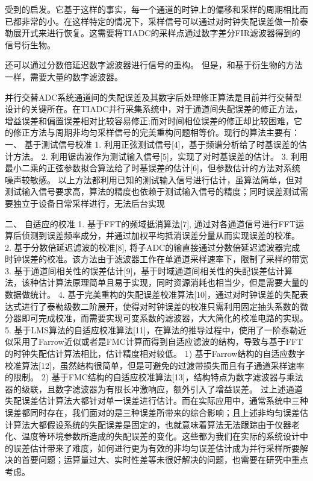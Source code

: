 				受到的启发。它基于这样的事实，每一个通道的时钟上的偏移和采样的周期相比而已都非常的小。在这样特定的情况下，采样信号可以通过对时钟失配误差做一阶泰勒展开式来进行恢复。这需要将TIADC的采样点通过数字差分FIR滤波器得到的信号衍生物。
				\par
				
				还可以通过分数倍延迟数字滤波器进行信号的重构。
				但是，和基于衍生物的方法一样，需要大量的数字滤波器。
				
				
				
				
					
					
				并行交替ADC系统通道间的失配误差及其数字后处理修正算法是目前并行交替型设计的关键所在。在TIADC并行采集系统中，对于通道间失配误差的修正方法，增益误差和偏置误差相对比较容易修正;而对时间相位误差的修正却比较困难，它的修正方法与周期非均匀采样信号的完美重构问题相等价。现行的算法主要有：
一、	基于测试信号校准
1.	利用正弦测试信号[4]，基于频谱分析给了时基误差的估计方法。
2.	利用锯齿波作为测试输入信号[5]，实现了对时基误差的估计。
3.	利用最小二乘的正弦参数拟合算法给了时基误差的估计[6]，但参数估计的方法对系统噪声较敏感。
以上方法都利用已知的测试输入信号进行估计，虽算法简单，但对测试输入信号要求高，算法的精度也依赖于测试输入信号的精度；同时误差测试需要独立于设备日常采样进行，无法后台实现


二、	自适应的校准
1.	基于FFT的频域抵消算法[7], 通过对各通道信号进行FFT运算后侦测到误差频率成分，并通过加权平均抵消误差分量从而实现误差的校准。
2.	基于分数倍延迟滤波的校准[8], 将子ADC的输直接通过分数倍延迟滤波器完成时钟误差的校准。该方法由于滤波器工作在单通道采样速率下，限制了采样的带宽
3.	基于通道间相关性的误差估计[9]，基于时域通道间相关性的失配误差估计算法，该种估计算法原理简单且易于实现，同时资源消耗也相当少，但是需要大量的数据做统计。
4.	基于完美重构的失配误差校准算法[10]，通过对时钟误差的失配表达式进行了泰勒级数二阶展开，使得对时钟误差的校准只需利用固定抽头系数的微分器即可完成校准，而需要实现可变系数的滤波器，大大简化的校准电路的实现。
5.	基于LMS算法的自适应校准算法[11]，在算法的推导过程中，使用了一阶泰勒近似采用了Farrow近似或者是FMC计算而得到自适应滤波的结构，导致与基于FFT的时钟失配估计算法相比，估计精度相对较低。
1)	基于Farrow结构的自适应数字校准算法[12]，虽然结构很简单，但是可避免的过渡带损失而且有子通道采样速率的限制。
2)	基于FMC结构的自适应校准算法[13]，结构特点为数字滤波器与乘法器的级联，且数字滤波器为有限长冲激响应，额外引入了增益误差。
过上述通道失配误差估计算法大都针对单一误差进行估计。而在实际应用中，通常系统中三种误差都同时存在，我们面对的是三种误差所带来的综合影响；且上述非均匀误差估计算法大都假设系统的失配误差是固定的，也就意味着算法无法跟踪由于仪器老化、温度等环境参数所造成的失配误差的变化。这些都为我们在实际的系统设计中的误差估计带来了难度，如何进行更为有效的非均匀误差估计成为并行采样所要解决的首要问题；运算量过大、实时性差等未很好解决的问题，也需要在研究中重点考虑。

